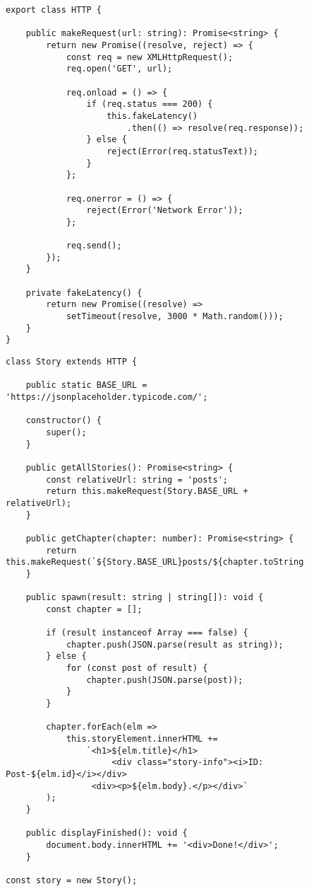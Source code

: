 \begin{figure}[H]
\begin{lstlisting}[basicstyle=\small]
export class HTTP {

    public makeRequest(url: string): Promise<string> {
        return new Promise((resolve, reject) => {
            const req = new XMLHttpRequest();
            req.open('GET', url);

            req.onload = () => {
                if (req.status === 200) {
                    this.fakeLatency()
                        .then(() => resolve(req.response));
                } else {
                    reject(Error(req.statusText));
                }
            };

            req.onerror = () => {
                reject(Error('Network Error'));
            };

            req.send();
        });
    }

    private fakeLatency() {
        return new Promise((resolve) =>
            setTimeout(resolve, 3000 * Math.random()));
    }
}
\end{lstlisting}
\end{figure}

\begin{figure}[H]
\begin{lstlisting}[basicstyle=\small]
class Story extends HTTP {

    public static BASE_URL = 'https://jsonplaceholder.typicode.com/';

    constructor() {
        super();
    }

    public getAllStories(): Promise<string> {
        const relativeUrl: string = 'posts';
        return this.makeRequest(Story.BASE_URL + relativeUrl);
    }

    public getChapter(chapter: number): Promise<string> {
        return this.makeRequest(`${Story.BASE_URL}posts/${chapter.toString()}`);
    }

    public spawn(result: string | string[]): void {
        const chapter = [];

        if (result instanceof Array === false) {
            chapter.push(JSON.parse(result as string));
        } else {
            for (const post of result) {
                chapter.push(JSON.parse(post));
            }
        }

        chapter.forEach(elm =>
            this.storyElement.innerHTML +=
                `<h1>${elm.title}</h1>
                     <div class="story-info"><i>ID: Post-${elm.id}</i></div>
                 <div><p>${elm.body}.</p></div>`
        );
    }

    public displayFinished(): void {
        document.body.innerHTML += '<div>Done!</div>';
    }

const story = new Story();
\end{lstlisting}
\end{figure}

